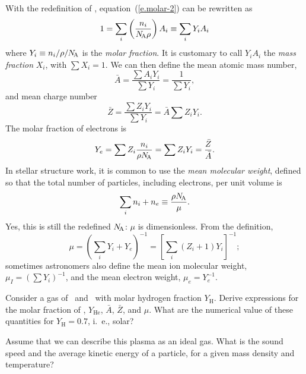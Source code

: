 With the redefinition of \NA, equation~(\ref{e.molar-2}) can be rewritten as
\begin{equation}\label{e.}
1 = \sum_{i}\left(\frac{n_{i}}{N_\mathrm{\!A}\rho}\right)A_{i} \equiv \sum_{i}Y_{i}A_{i}
\end{equation}
where $Y_{i} \equiv n_{i}/\rho/N_\mathrm{\!A}$ is the \emph{molar fraction}. It is customary to call $Y_{i}A_{i}$ the \emph{mass fraction} $X_{i}$, with $\sum X_{i} = 1$. We can then define the mean atomic mass number,
\begin{equation}\label{e.mean-A}
\bar{A} = \frac{\sum A_{i}Y_{i}}{\sum Y_{i}} = \frac{1}{\sum Y_{i}},
\end{equation}
and mean charge number
\begin{equation}\label{e.mean-Z}
\bar{Z} = \frac{\sum Z_{i}Y_{i}}{\sum Y_{i}} = \bar{A} \sum Z_{i}Y_{i}.
\end{equation}
The molar fraction of electrons is
\begin{equation}\label{e.Ye}
Y_{e} = \sum Z_{i} \frac{n_{i}}{\rho N_\mathrm{\!A}} = \sum Z_{i}Y_{i} = \frac{\bar{Z}}{\bar{A}}.
\end{equation}
In stellar structure work, it is common to use the \emph{mean molecular weight}, defined so that the total number of particles, including electrons, per unit volume is
\begin{equation}\label{e.mean-molecular-weight}
\sum_{i} n_{i} + n_{e} \equiv \frac{\rho N_\mathrm{\!A}}{\mu}.
\end{equation}
Yes, this is still the redefined $N_\mathrm{\!A}$: $\mu$ is dimensionless. From the definition,
\[
\mu = \left(\sum_{i}Y_{i} + Y_{e}\right)^{-1} = \left[ \sum_{i}\left(Z_{i}+1\right)Y_{i} \right]^{-1};
\]
sometimes astronomers also define the mean ion molecular weight, $\mu_{I} = (\sum Y_{i})^{-1}$, and the mean electron weight, $\mu_{e} = Y_{e}^{-1}$.

\begin{exercisebox}
Consider a gas of \hydrogen\ and \helium\ with molar hydrogen fraction $Y_{\mathrm{H}}$.  Derive expressions for the molar fraction of \helium, $Y_{\mathrm{He}}$, $\bar{A}$, $\bar{Z}$, and $\mu$. What are the numerical value of these quantities for $Y_{\mathrm{H}} = 0.7$, i.~e., solar?
\end{exercisebox}

\begin{exercisebox}
Assume that we can describe this plasma as an ideal gas.  What is the sound speed and the average kinetic energy of a particle, for a given mass density and temperature?
\end{exercisebox}


